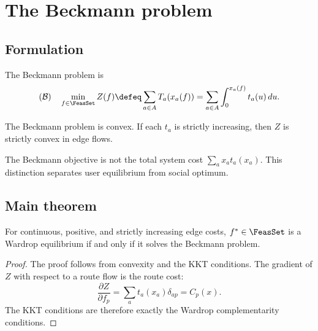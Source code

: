\label{cap:beckmann}

\section{The Beckmann problem}

\subsection{Formulation}


\begin{definition}\label{def:beckmann}
The Beckmann problem is
\[
(\mathcal{B}) \quad \min_{f \in \FeasSet}
Z(f) \defeq \sum_{a \in A} T_a(x_a(f))
= \sum_{a \in A}\int_0^{x_a(f)}t_a(u)\,du.
\]
\end{definition}

\begin{proposition}\label{prop:beckmann_convex}
The Beckmann problem is convex. If each $t_a$ is strictly increasing, then $Z$ is strictly convex in edge flows.
\end{proposition}

\begin{remark}
The Beckmann objective is not the total system cost $\sum_a x_a t_a(x_a)$. This distinction separates user equilibrium from social optimum.
\end{remark}

\subsection{Main theorem}

\begin{theorem}\label{thm:beckmann}
For continuous, positive, and strictly increasing edge costs, $f^* \in \FeasSet$ is a Wardrop equilibrium if and only if it solves the Beckmann problem.
\end{theorem}

\begin{proof}
The proof follows from convexity and the KKT conditions. The gradient of $Z$ with respect to a route flow is the route cost:
\[
\frac{\partial Z}{\partial f_p} = \sum_a t_a(x_a)\delta_{ap} = C_p(x).
\]
The KKT conditions are therefore exactly the Wardrop complementarity conditions.
\end{proof}

